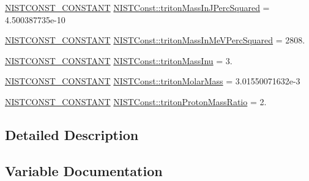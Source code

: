 \begin{DoxyCompactItemize}
\item 
\mbox{\hyperlink{_n_i_s_t_const_8hpp_a2b0fc1d7452373f816175dd86ce26729}{N\+I\+S\+T\+C\+O\+N\+S\+T\+\_\+\+C\+O\+N\+S\+T\+A\+NT}} \mbox{\hyperlink{group___n_i_s_t_const-_triton_ga1b596ac52463b085cdb6377db6fd5f6d}{N\+I\+S\+T\+Const\+::triton\+Mass\+In\+J\+Perc\+Squared}} = 4.\+500387735e-\/10
\item 
\mbox{\hyperlink{_n_i_s_t_const_8hpp_a2b0fc1d7452373f816175dd86ce26729}{N\+I\+S\+T\+C\+O\+N\+S\+T\+\_\+\+C\+O\+N\+S\+T\+A\+NT}} \mbox{\hyperlink{group___n_i_s_t_const-_triton_ga96449cb5ba8f6cc6d11e0232891ef790}{N\+I\+S\+T\+Const\+::triton\+Mass\+In\+Me\+V\+Perc\+Squared}} = 2808.
\item 
\mbox{\hyperlink{_n_i_s_t_const_8hpp_a2b0fc1d7452373f816175dd86ce26729}{N\+I\+S\+T\+C\+O\+N\+S\+T\+\_\+\+C\+O\+N\+S\+T\+A\+NT}} \mbox{\hyperlink{group___n_i_s_t_const-_triton_gaf197122d8768d41b57cfbcc23088818a}{N\+I\+S\+T\+Const\+::triton\+Mass\+Inu}} = 3.
\item 
\mbox{\hyperlink{_n_i_s_t_const_8hpp_a2b0fc1d7452373f816175dd86ce26729}{N\+I\+S\+T\+C\+O\+N\+S\+T\+\_\+\+C\+O\+N\+S\+T\+A\+NT}} \mbox{\hyperlink{group___n_i_s_t_const-_triton_gabc438ce6d1b317f1048dc34433c3854a}{N\+I\+S\+T\+Const\+::triton\+Molar\+Mass}} = 3.\+01550071632e-\/3
\item 
\mbox{\hyperlink{_n_i_s_t_const_8hpp_a2b0fc1d7452373f816175dd86ce26729}{N\+I\+S\+T\+C\+O\+N\+S\+T\+\_\+\+C\+O\+N\+S\+T\+A\+NT}} \mbox{\hyperlink{group___n_i_s_t_const-_triton_gaeb92adcaef164332cec64547c842b0ea}{N\+I\+S\+T\+Const\+::triton\+Proton\+Mass\+Ratio}} = 2.
\end{DoxyCompactItemize}


\subsection{Detailed Description}


\subsection{Variable Documentation}
\mbox{\label{group___n_i_s_t_const-_triton_gafedefaa51aee922ff69f0b4dbff11782}} 
